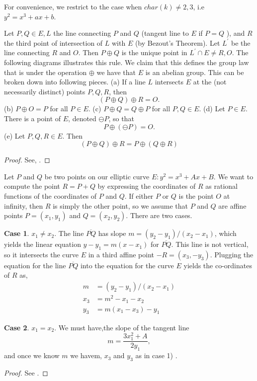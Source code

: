 For convenience, we restrict to the case when $char(k) \neq 2,3$, i.e  $y^2=x^3+ax+b$.
\begin{proposition}
Let $P, Q \in E, L$ the line connecting $P$ and $Q$ (tangent line to $E$ if $P=Q$ ), and $R$ the third point of intersection of $L$ with $E$ (by Bezout's Theorem). Let $L^{\prime}$ be the line connecting $R$ and $O$. Then $P \oplus Q$ is the unique point in $ L^{\prime}\cap E \neq R, O$. 
The following diagrams illustrates this rule. 
We claim that this defines the group law that is under the operation $\oplus$ we have that $E$ is an abelian group. This can be broken down into following pieces. \newline
(a) If a line $L$ intersects $E$ at the (not necessarily distinct) points $P, Q, R$, then
$$
(P \oplus Q) \oplus R=O .
$$
(b) $P \oplus O=P$ for all $P \in E$.
(c) $P \oplus Q=Q \oplus P$ for all $P, Q \in E$.
(d) Let $P \in E$. There is a point of $E$, denoted $\ominus P$, so that
$$
P \oplus(\ominus P)=O .
$$
(e) Let $P, Q, R \in E$. Then
$$
(P \oplus Q) \oplus R=P \oplus(Q \oplus R)
$$
 
\end{proposition}

\begin{proof}
    See, \cite{silv}.
\end{proof}

\begin{proposition}
Let $P$ and $Q$ be two points on our elliptic curve $E: y^2=x^3+A x+B$. We want to compute the point $R=P+Q$ by expressing the coordinates of $R$ as rational functions of the coordinates of $P$ and $Q$. If either $P$ or $Q$ is the point $O$ at infinity, then $R$ is simply the other point, so we assume that $P$ and $Q$ are affine points $P=\left(x_1, y_1\right)$ and $Q=\left(x_2, y_2\right)$. There are two cases.
\bigskip


\textbf{Case 1}. $x_1 \neq x_2$. The line $\overline{P Q}$ has slope $m=\left(y_2-y_1\right) /\left(x_2-x_1\right)$, which yields the linear equation $y-y_1=m\left(x-x_1\right)$ for $\overline{P Q}$. This line is not vertical, so it intersects the curve $E$ in a third affine point $-R=\left(x_3,-y_3\right)$. Plugging the equation for the line $\overline{P Q}$ into the equation for the curve $E$ yields the co-ordinates of $R$ as, 
$$
\begin{aligned}
m & =\left(y_2-y_1\right) /\left(x_2-x_1\right) \\
x_3 & =m^2-x_1-x_2 \\
y_3 & =m\left(x_1-x_3\right)-y_1
\end{aligned}
$$

\textbf{Case 2}. $x_1=x_2$. We must have,the slope of the tangent line
$$
m=\frac{3 x_1^2+A}{2 y_1},
$$
and once we know $m$ we havem, $x_3$ and $y_3$ as in case 1) .
\begin{proof}
    See \cite{silv}.
\end{proof}
\end{proposition}

